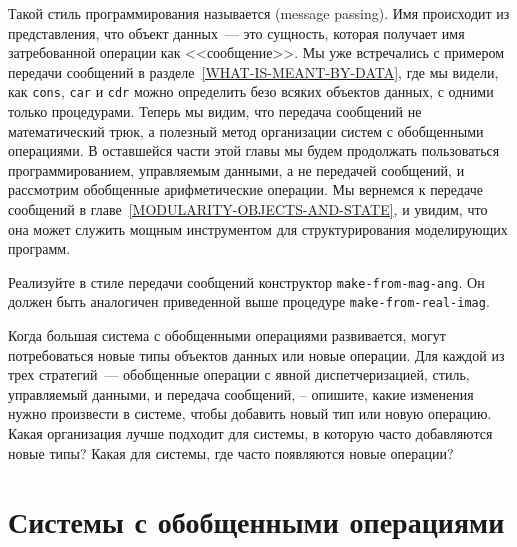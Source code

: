 Такой стиль программирования называется 
 (message
passing).  Имя 
происходит из представления, что объект данных~--- это сущность,
которая получает имя затребованной операции как <<сообщение>>.  Мы уже
встречались с примером передачи сообщений в разделе~\ref{WHAT-IS-MEANT-BY-DATA},
где мы видели, как {\tt cons}, {\tt car} и
{\tt cdr} можно определить безо всяких объектов данных, с
одними только процедурами.  Теперь мы видим, что передача сообщений не
математический трюк, а полезный метод организации систем с обобщенными
операциями.  В оставшейся части этой главы мы будем продолжать
пользоваться программированием, управляемым данными, а не передачей
сообщений, и рассмотрим обобщенные арифметические операции.  Мы
вернемся к передаче сообщений в главе~\ref{MODULARITY-OBJECTS-AND-STATE},
и увидим, что она может служить мощным инструментом для
структурирования моделирующих программ.

\begin{exercise}{2.75}\label{EX2.75}%
Реализуйте в стиле передачи сообщений конструктор
{\tt make-from-mag-ang}.
Он должен быть аналогичен приведенной
выше процедуре {\tt make-from-real-imag}.
\end{exercise}

\begin{exercise}{2.76}\label{EX2.76}%
% 
Когда большая система с обобщенными операциями
развивается, могут потребоваться новые типы объектов данных или новые
операции.  Для каждой из трех стратегий~--- обобщенные операции с явной
диспетчеризацией, стиль, управляемый данными, и передача сообщений, --
опишите, какие изменения нужно произвести в системе, чтобы добавить
новый тип или новую операцию.  Какая организация лучше подходит для
системы, в которую часто добавляются новые типы?  Какая для системы,
где часто появляются новые операции?
\end{exercise}

\section{Системы с обобщенными операциями}
\label{SYSTEMS-WITH-GENERIC-OPERATIONS}


